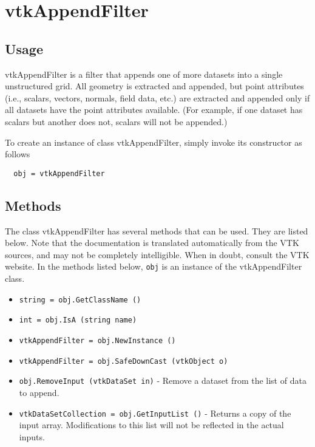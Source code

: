 \section{vtkAppendFilter}

\subsection{Usage}

 vtkAppendFilter is a filter that appends one of more datasets into a single
 unstructured grid. All geometry is extracted and appended, but point 
 attributes (i.e., scalars, vectors, normals, field data, etc.) are extracted 
 and appended only if all datasets have the point attributes available. 
 (For example, if one dataset has scalars but another does not, scalars will 
 not be appended.)

To create an instance of class vtkAppendFilter, simply
invoke its constructor as follows
\begin{verbatim}
  obj = vtkAppendFilter
\end{verbatim}
\subsection{Methods}

The class vtkAppendFilter has several methods that can be used.
  They are listed below.
Note that the documentation is translated automatically from the VTK sources,
and may not be completely intelligible.  When in doubt, consult the VTK website.
In the methods listed below, \verb|obj| is an instance of the vtkAppendFilter class.
\begin{itemize}
\item  \verb|string = obj.GetClassName ()|

\item  \verb|int = obj.IsA (string name)|

\item  \verb|vtkAppendFilter = obj.NewInstance ()|

\item  \verb|vtkAppendFilter = obj.SafeDownCast (vtkObject o)|

\item  \verb|obj.RemoveInput (vtkDataSet in)| -  Remove a dataset from the list of data to append.

\item  \verb|vtkDataSetCollection = obj.GetInputList ()| -  Returns a copy of the input array.  Modifications to this list
 will not be reflected in the actual inputs.

\end{itemize}
